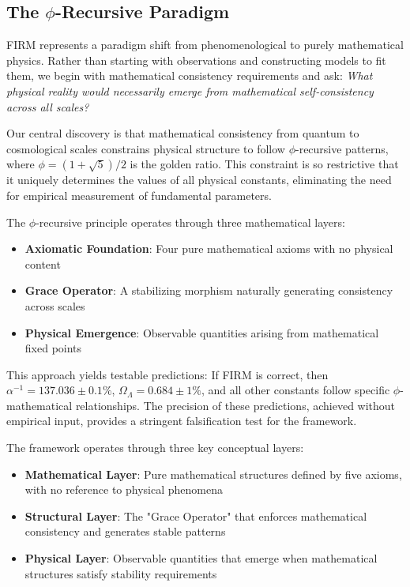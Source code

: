\documentclass[12pt]{article}
\begin{document}
\subsection{The $\phi$-Recursive Paradigm}

FIRM represents a paradigm shift from phenomenological to purely mathematical physics. Rather than starting with observations and constructing models to fit them, we begin with mathematical consistency requirements and ask: \emph{What physical reality would necessarily emerge from mathematical self-consistency across all scales?}

Our central discovery is that mathematical consistency from quantum to cosmological scales constrains physical structure to follow $\phi$-recursive patterns, where $\phi = (1+\sqrt{5})/2$ is the golden ratio. This constraint is so restrictive that it uniquely determines the values of all physical constants, eliminating the need for empirical measurement of fundamental parameters.

The $\phi$-recursive principle operates through three mathematical layers:
\begin{itemize}
    \item \textbf{Axiomatic Foundation}: Four pure mathematical axioms with no physical content
    \item \textbf{Grace Operator}: A stabilizing morphism naturally generating consistency across scales  
    \item \textbf{Physical Emergence}: Observable quantities arising from mathematical fixed points
\end{itemize}

This approach yields testable predictions: If FIRM is correct, then $\alpha^{-1} = 137.036 \pm 0.1\%$, $\Omega_\Lambda = 0.684 \pm 1\%$, and all other constants follow specific $\phi$-mathematical relationships. The precision of these predictions, achieved without empirical input, provides a stringent falsification test for the framework.

The framework operates through three key conceptual layers:
\begin{itemize}
    \item \textbf{Mathematical Layer}: Pure mathematical structures defined by five axioms, with no reference to physical phenomena
    \item \textbf{Structural Layer}: The "Grace Operator" that enforces mathematical consistency and generates stable patterns  
    \item \textbf{Physical Layer}: Observable quantities that emerge when mathematical structures satisfy stability requirements
\end{itemize}
\end{document}
